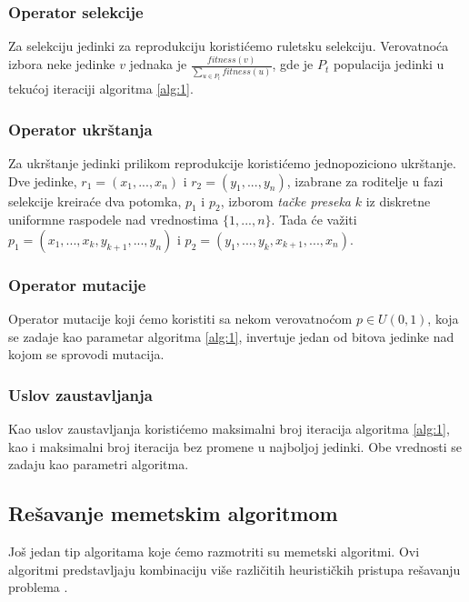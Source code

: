 \documentclass[12pt, a4paper]{article}
\theoremstyle{definition}
\begin{document}
\subsubsection{Operator selekcije}

Za selekciju jedinki za reprodukciju koristićemo ruletsku selekciju. Verovatnoća izbora neke jedinke $v$ jednaka je $\frac{fitness(v)}{\sum_{u \in P_t} fitness(u)}$, gde je $P_t$ populacija jedinki u tekućoj iteraciji algoritma \ref{alg:1}.

\subsubsection{Operator ukrštanja}

Za ukrštanje jedinki prilikom reprodukcije koristićemo jednopoziciono ukrštanje. Dve jedinke, $r_1 = (x_1, ..., x_n)$ i $r_2 = (y_1, ..., y_n)$, izabrane za roditelje u fazi selekcije kreiraće dva potomka, $p_1$ i $p_2$, izborom \emph{tačke preseka} $k$ iz diskretne uniformne raspodele nad vrednostima $\{1, ..., n\}$. Tada će važiti $p_1 = (x_1, ..., x_k, y_{k + 1}, ..., y_n)$ i $p_2 = (y_1, ..., y_k, x_{k + 1}, ..., x_n)$.

\subsubsection{Operator mutacije}

Operator mutacije koji ćemo koristiti sa nekom verovatnoćom $p \in U(0, 1)$, koja se zadaje kao parametar algoritma \ref{alg:1}, invertuje jedan od bitova jedinke nad kojom se sprovodi mutacija.

\subsubsection{Uslov zaustavljanja}

Kao uslov zaustavljanja koristićemo maksimalni broj iteracija algoritma \ref{alg:1}, kao i maksimalni broj iteracija bez promene u najboljoj jedinki. Obe vrednosti se zadaju kao parametri algoritma.

\subsection{Rešavanje memetskim algoritmom}

Još jedan tip algoritama koje ćemo razmotriti su memetski algoritmi. Ovi algoritmi predstavljaju kombinaciju više različitih heurističkih pristupa rešavanju problema \cite{4}.
\end{document}
